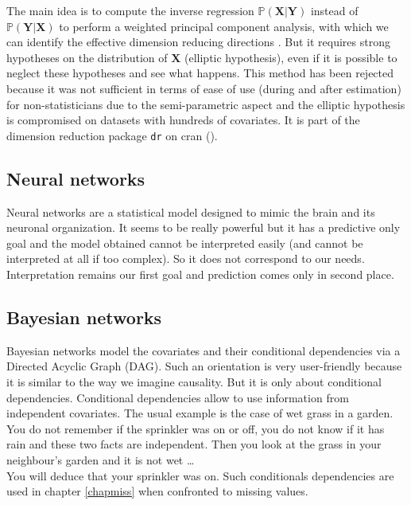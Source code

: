 \documentclass[12pt,a4paper]{report}
\begin{document}
		The main idea is to compute the inverse regression $\mathbb{P}(\boldsymbol{X}|\boldsymbol{Y})$ instead of $\mathbb{P}(\boldsymbol{Y}|\boldsymbol{X})$ to perform a weighted principal component analysis, with which we can identify the effective dimension reducing directions \cite{li1991sliced}. But it requires strong hypotheses on the distribution of $\boldsymbol{X}$ (elliptic hypothesis), even if it is possible to neglect these hypotheses \cite{saracco1999regression} and see what happens. This method has been rejected because it was not sufficient in terms of ease of use (during and after estimation) for non-statisticians due to the semi-parametric aspect and the elliptic hypothesis is compromised on datasets with hundreds of covariates. It is part of the dimension reduction package {\tt dr} on {\sc cran} (\cite{packagedr}).
		
	
	\subsection{Neural networks}	
		Neural networks \cite{fausett1994fundamentals} are a statistical model designed to mimic the brain and its neuronal organization. It seems to be really powerful but it has a predictive only goal and the model obtained cannot be interpreted easily (and cannot be interpreted at all if too complex). So it does not correspond to our needs. Interpretation remains our first goal and prediction comes only in second place.
		
	\subsection{Bayesian networks}
		
		Bayesian networks \cite{heckerman1995learning,jensen2007bayesian,friedman2000using} model the covariates and their conditional dependencies via a Directed Acyclic Graph (DAG). Such an orientation is very user-friendly because it is similar to the way we imagine causality. But it is only about conditional dependencies. Conditional dependencies allow to use information from independent covariates. The usual example is the case of wet grass in a garden. You do not remember if the sprinkler was on or off, you do not know if it has rain and these two facts are independent. Then you look at the grass in your neighbour's garden and it is not wet \dots \\
		You will deduce that your sprinkler was on. Such conditionals dependencies are used in chapter \ref{chapmiss} when confronted to missing values. \\
		
\end{document}
